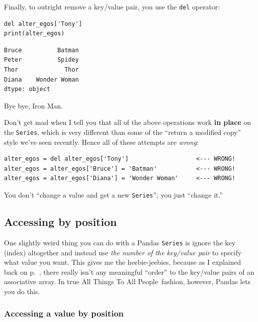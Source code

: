 Finally, to outright remove a key/value pair, you use the \texttt{del}
operator:

\begin{Verbatim}[fontsize=\small,samepage=true,frame=single,framesep=3mm]
del alter_egos['Tony']
print(alter_egos)
\end{Verbatim}

\begin{Verbatim}[fontsize=\small,samepage=true,frame=leftline,framesep=5mm,framerule=1mm]
Bruce          Batman
Peter          Spidey
Thor             Thor
Diana    Wonder Woman
dtype: object
\end{Verbatim}

Bye bye, Iron Man.


Don't get mad when I tell you that all of the above operations work
\textbf{in place} on the \texttt{Series}, which is very different than some of
the ``return a modified copy'' style we've seen recently. Hence all of these
attempts are \textit{wrong}:

\begin{Verbatim}[fontsize=\small,samepage=true,frame=single,framesep=3mm]
alter_egos = del alter_egos['Tony']                   <--- WRONG!
alter_egos = alter_egos['Bruce'] = 'Batman'           <--- WRONG!
alter_egos = alter_egos['Diana'] = 'Wonder Woman'     <--- WRONG!
\end{Verbatim}

You don't ``change a value and get a new \texttt{Series}''; you just
``change it.''

\subsection{Accessing by position}


One slightly weird thing you can do with a Pandas \texttt{Series} is ignore the
key (index) altogether and instead use \textit{the number of the key/value
pair} to specify what value you want. This gives me the heebie-jeebies, because
as I explained back on p.~\pageref{assocArraysUnordered}, there really isn't
any meaningful ``order'' to the key/value pairs of an associative array. In
true All Things To All People\texttrademark~fashion, however, Pandas lets you
do this.

\subsubsection{Accessing a value by position}

